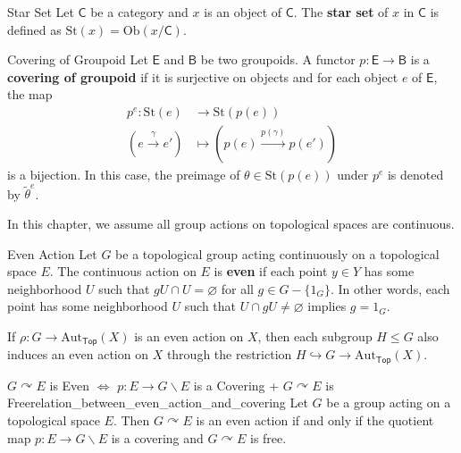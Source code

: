 \documentclass{report}
\def\acts{\curvearrowright}
\begin{document}
\begin{definition}{Star Set}{}
	Let $\mathsf{C}$ be a category and $x$ is an object of $\mathsf{C}$. The \textbf{star set} of $x$ in $\mathsf{C}$ is defined as
	$\mathrm{St}(x)=\mathrm{Ob}\left(x/\mathsf{C}\right)$.
\end{definition}

\begin{definition}{Covering of Groupoid}{}
	Let $\mathsf{E}$ and $\mathsf{B}$ be two groupoids. A functor $p:\mathsf{E}\to\mathsf{B}$ is a \textbf{covering of groupoid} if it is surjective on objects and for each object $e$ of $\mathsf{E}$, the map
	\begin{align*}
		p^{e}:\mathrm{St}(e)                  & \longrightarrow\mathrm{St}(p(e))                           \\
		\left(e\xrightarrow{\gamma} e'\right) & \longmapsto \left(p(e)\xrightarrow{p(\gamma)} p(e')\right)
	\end{align*}
	is a bijection. In this case, the preimage of $\theta\in\mathrm{St}(p(e))$ under $p^{e}$ is denoted by $\widetilde{\theta}^e$.
\end{definition}

In this chapter, we assume all group actions on topological spaces are continuous.


\begin{definition}{Even Action}{}
	Let $G$ be a topological group acting continuously on a topological space $E$. The continuous action on $E$ is \textbf{even} if each point $y \in Y$ has some neighborhood $U$ such that $gU\cap U=\varnothing$ for all $g\in G-\{1_G\}$. In other words, each point has some neighborhood $U$ such that $U \cap gU \neq \varnothing$ implies $g=1_G$.
\end{definition}


If $\rho:G\to \mathrm{Aut}_{\mathsf{Top}}(X)$ is an even action on $X$, then each subgroup $H\leq G$ also induces an even action on $X$ through the restriction $H\hookrightarrow G\to \mathrm{Aut}_{\mathsf{Top}}(X)$.

\begin{proposition}{$G \acts E$ is Even $\iff$ $p: E\to G\backslash E$ is a Covering + $G \acts E$ is Free}{relation_between_even_action_and_covering}
	Let $G$ be a group acting on a topological space $E$. Then $G \acts E$ is an even action if and only if the quotient map $p: E\to G\backslash E$ is a covering and $G \acts E$ is free.
\end{proposition}
\end{document}
